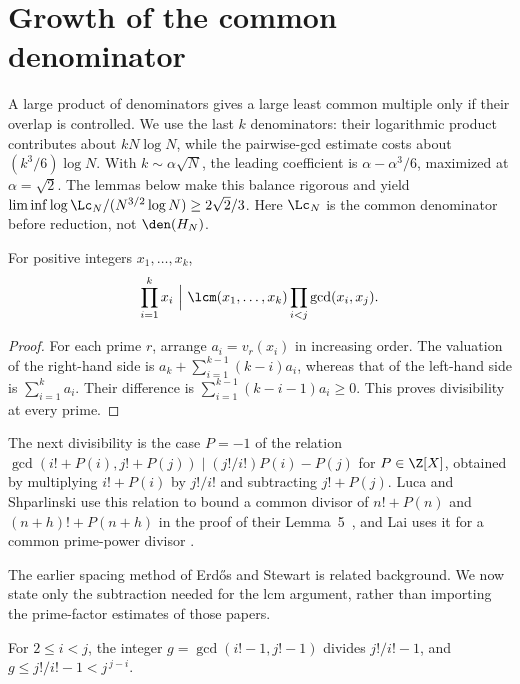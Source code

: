 \section{Growth of the common denominator}\label{long68:sec:lcm}

A large product of denominators gives a large least common multiple
only if their overlap is controlled. We use the last $k$ denominators:
their logarithmic product contributes about $kN\log N$, while the
pairwise-gcd estimate costs about $(k^3/6)\log N$. With
$k\sim\alpha\sqrt N$, the leading coefficient is
$\alpha-\alpha^3/6$, maximized at $\alpha=\sqrt2$.
The lemmas below make this balance rigorous and yield
$\liminf\log\Lc_N/(N^{3/2}\log N)\ge2\sqrt2/3$.
Here $\Lc_N$ is the common denominator before reduction, not
$\den(H_N)$.

\begin{lemma}
\label{long68:res:product-lcm}
For positive integers $x_1,\ldots,x_k$,
\[
 \prod_{i=1}^{k}x_i\ \Big|\ \lcm(x_1,\ldots,x_k)\prod_{i<j}\gcd(x_i,x_j).
\]
\end{lemma}

\begin{proof}
For each prime $r$, arrange $a_i=v_r(x_i)$ in increasing order.
The valuation of the right-hand side is
$a_k+\sum_{i=1}^{k-1}(k-i)a_i$, whereas that of the left-hand side is
$\sum_{i=1}^k a_i$. Their difference is
$\sum_{i=1}^{k-1}(k-i-1)a_i\ge0$. This proves divisibility at every prime.
\end{proof}

\noindent The next divisibility is the case $P=-1$ of the relation
$\gcd(i!+P(i),j!+P(j))\mid (j!/i!)P(i)-P(j)$ for $P\in\Z[X]$, obtained by
multiplying $i!+P(i)$ by $j!/i!$ and subtracting $j!+P(j)$.  Luca and
Shparlinski use this relation to bound a common divisor of $n!+P(n)$ and
$(n+h)!+P(n+h)$ in the proof of their Lemma~5~\cite{luca-shparlinski}, and Lai
uses it for a common prime-power divisor
\cite[proof of Lemma~2.4, display~(2.5)]{lai}.

The earlier spacing method of Erd\H{o}s and Stewart
\cite[\S3, pp.~516--517]{erdos-stewart1976} is related background.
We now state only the subtraction needed for the lcm argument, rather than
importing the prime-factor estimates of those papers.

\begin{lemma}\label{long68:res:gap-gcd}
For $2\le i<j$, the integer $g=\gcd(i!-1,j!-1)$ divides $j!/i!-1$, and
$g\le j!/i!-1<j^{\,j-i}$.
\end{lemma}


